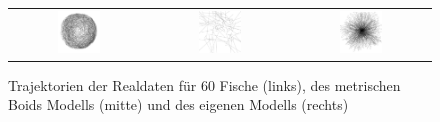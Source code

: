 \begin{refsection}
\begin{figure}[H]
\centering
\begin{tabular}{ccc}
\includegraphics[width=0.33\textwidth]{figures/Experimente/Realdaten/Fisch_60_REAL.png} &
\includegraphics[width=0.33\textwidth]{figures/Experimente/Realdaten/Boids_60_Fisch.png} &
\includegraphics[width=0.33\textwidth]{figures/Experimente/Realdaten/PWD_60_Fisch_sim.png} 
\end{tabular}
\caption{Trajektorien der Realdaten für 60 Fische (links), des metrischen Boids Modells (mitte) und des eigenen Modells (rechts)\label{fig:60FischTraj}}
\end{figure}


\printbibliography[heading=subbibliography]
\end{refsection}


